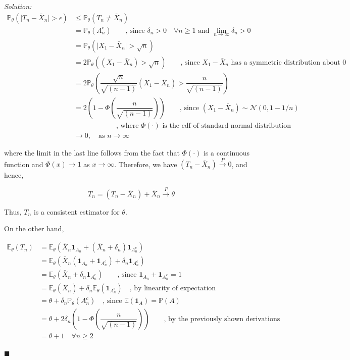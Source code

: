 \documentclass[12pt]{article}
\newcommand{\E}{\mathbb{E}}
\newcommand{\prob}{\mathbb{P}}
\newcommand{\normal}{\mathcal{N}}
\theoremstyle{definition}
\newenvironment{answer}{\textit{Solution: }\quad }{ \hfill $\blacksquare$}
\numberwithin{equation}{section}
\begin{document}
\begin{answer}
\begingroup
\allowdisplaybreaks
\begin{align*}
    \prob_\theta(\vert T_n - \bar{X}_n \vert > \epsilon)
    & \leq \prob_\theta( T_n \neq \bar{X}_n ) \\
    & = \prob_\theta(A_n^c) \qquad \text{, since } \delta_n > 0 \quad\forall n \geq 1 \text{ and } \lim_{n \rightarrow \infty} \delta_n > 0\\
    & = \prob_\theta\left( \vert X_1 - \bar{X}_n \vert > \sqrt{n} \right)\\
    & = 2 \prob_\theta\left( (X_1 - \bar{X}_n) > \sqrt{n} \right) \qquad \text{, since } X_1 - \bar{X}_n \text{ has a symmetric distribution about 0}\\
    & = 2 \prob_\theta\left( \dfrac{\sqrt{n}}{\sqrt{(n-1)}} (X_1 - \bar{X}_n) > \dfrac{n}{\sqrt{(n-1)}} \right)\\
    & = 2 \left(1 - \Phi\left( \dfrac{n}{\sqrt{(n-1)}} \right)\right) \qquad \text{, since } (X_1 - \bar{X}_n) \sim \normal(0, 1-1/n)\\
    & \qquad \qquad \qquad \text{, where } \Phi(\cdot) \text{ is the cdf of standard normal distribution}\\  
    & \rightarrow 0, \quad \text{as } n \rightarrow \infty
\end{align*}
\endgroup

where the limit in the last line follows from the fact that $\Phi(\cdot)$ is a continuous function and $\Phi(x) \rightarrow 1$ as $x \rightarrow \infty$. Therefore, we have $(T_n - \bar{X}_n) \xrightarrow{P} 0$, and hence, 

$$T_n = (T_n - \bar{X}_n) + \bar{X}_n \xrightarrow{P} \theta$$

Thus, $T_n$ is a consistent estimator for $\theta$.

On the other hand,
 
\begin{align*}
    \E_\theta(T_n) 
    & = \E_\theta\left( \bar{X}_n \bm{1}_{A_n} + (\bar{X}_n + \delta_n)\bm{1}_{A_n^c} \right)\\
    & = \E_\theta\left( \bar{X}_n (\bm{1}_{A_n} + \bm{1}_{A_n^c}) + \delta_n \bm{1}_{A_n^c} \right)\\
    & = \E_\theta\left( \bar{X}_n + \delta_n \bm{1}_{A_n^c} \right) \qquad \text{, since } \bm{1}_{A_n} + \bm{1}_{A_n^c} = 1\\
    & = \E_\theta\left( \bar{X}_n \right) + \delta_n \E_\theta\left( \bm{1}_{A_n^c} \right) \quad \text{, by linearity of expectation}\\
    & = \theta + \delta_n \prob_\theta(A_n^c) \quad \text{, since } \E(\bm{1}_A) = \prob(A)\\
    & = \theta + 2\delta_n \left( 1 - \Phi\left( \dfrac{n}{\sqrt{(n-1)}}\right) \right) \qquad \text{, by the previously shown derivations}\\
    & = \theta + 1 \quad \forall n \geq 2 
\end{align*}


\end{answer}
\end{document}
